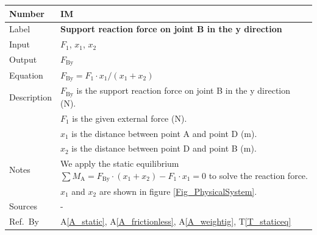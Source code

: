 \documentclass[12pt]{article}
\newcommand{\colAwidth}{0.13\textwidth}
\newcommand{\colBwidth}{0.82\textwidth}
\newcommand{\tref}[1]{T\ref{#1}}
\newcommand{\aref}[1]{A\ref{#1}}
\newcounter{instnum} %
\begin{document}
\noindent
\begin{minipage}{\textwidth}
	\renewcommand*{\arraystretch}{1.5}
	\begin{tabular}{| p{\colAwidth} | p{\colBwidth}|}
		\hline
		\rowcolor[gray]{0.9}
		Number& IM{instnum}\theinstnum \label{I_solveFby}\\
		\hline
		Label& \bf Support reaction force on joint B in the y direction\\
		\hline
		Input& $F_\text{1}$, $x_\text{1}$, $x_\text{2}$ \\
		\hline
		Output& $F_{\text{{By}}}$ \\
		\hline
		Equation& $F_{\text{By}} = F_\text{1} \cdot x_\text{1} / (x_\text{1} + 
		x_\text{2})$ \\
		\hline
		Description&$F_{\text{By}}$ is the support reaction force on joint B in 
		the y direction (N).\\
		&$F_1$ is the given external force (N).\\
		&$x_1$ is the distance between point A and point D (m).\\
		&$x_2$ is the distance between point D and point B (m).\\
		\hline
		Notes& We apply the static equilibrium $\sum M_{\text{A}} = 
		F_{\text{By}} \cdot (x_\text{1} + x_\text{2}) - F_\text{1} \cdot 
		x_\text{1} = 0$ to solve the reaction force. \\
		&$x_1$ and $x_2$ are shown in figure \ref{Fig_PhysicalSystem}. \\
		\hline
		Sources& - \\
		\hline
		Ref.\ By & \aref{A_static}, \aref{A_frictionless}, \aref{A_weightig}, 
		\tref{T_staticeq} \\
		\hline
	\end{tabular}
\end{minipage}\\

~\newline
\end{document}

